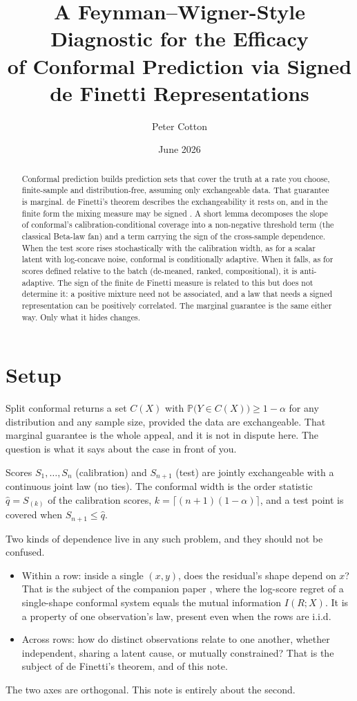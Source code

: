 \documentclass[11pt]{article}
\title{A Feynman--Wigner-Style Diagnostic for the Efficacy\\
of Conformal Prediction via Signed de Finetti Representations}
\author{Peter Cotton}
\date{June 2026}
\begin{document}
\maketitle

\begin{abstract}
Conformal prediction builds prediction sets that cover the truth at a rate you choose,
finite-sample and distribution-free, assuming only exchangeable data. That
guarantee is marginal. de Finetti's theorem describes the exchangeability it rests on, and in
the finite form the mixing measure may be signed \citep{kerns2006}. A short lemma decomposes the slope of
conformal's calibration-conditional coverage into a non-negative threshold term (the classical
Beta-law fan) and a term carrying the sign of the cross-sample dependence. When the test score
rises stochastically with the calibration width, as for a scalar latent with log-concave noise,
conformal is conditionally adaptive. When it falls, as for scores defined relative to the batch
(de-meaned, ranked, compositional), it is anti-adaptive. The sign of the finite de Finetti measure
is related to this but does not determine it: a positive mixture need not be associated, and a law
that needs a signed representation can be positively correlated. The marginal guarantee is the
same either way. Only what it hides changes.
\end{abstract}

\section{Setup}

Split conformal returns a set $C(X)$ with $\mathbb P\big(Y\in C(X)\big)\ge 1-\alpha$ for any
distribution and any sample size, provided the data are exchangeable. That marginal guarantee
is the whole appeal, and it is not in dispute here. The question is what it says about the case
in front of you.

Scores $S_1,\dots,S_n$ (calibration) and $S_{n+1}$ (test) are jointly
exchangeable with a continuous joint law (no ties). The conformal width is the order
statistic $\hat q = S_{(k)}$ of the calibration scores, $k=\lceil(n+1)(1-\alpha)\rceil$, and a
test point is covered when $S_{n+1}\le\hat q$.

Two kinds of dependence live in any such problem, and they should not be confused.
\begin{itemize}
\item Within a row: inside a single $(x,y)$, does the residual's shape depend on $x$? That is
the subject of the companion paper \citep{cotton_marginally}, where the log-score regret of a
single-shape conformal system equals the mutual information $I(R;X)$. It is a property of one
observation's law, present even when the rows are i.i.d.
\item Across rows: how do distinct observations relate to one another, whether independent,
sharing a latent cause, or mutually constrained? That is the subject of de Finetti's theorem,
and of this note.
\end{itemize}
The two axes are orthogonal. This note is entirely about the second.
\end{document}
